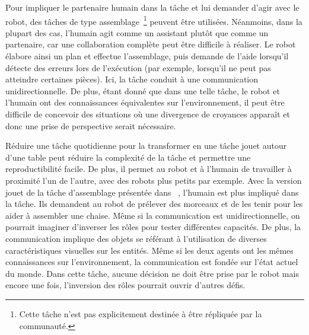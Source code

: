 Pour impliquer le partenaire humain dans la tâche et lui demander d'agir avec le robot, des tâches de type assemblage~\cite{tellex_2014_asking}\footnote{Cette tâche n'est pas explicitement destinée à être répliquée par la communauté.} peuvent être utilisées. Néanmoins, dans la plupart des cas, l'humain agit comme un assistant plutôt que comme un partenaire, car une collaboration complète peut être difficile à réaliser. Le robot élabore ainsi un plan et effectue l'assemblage, puis demande de l'aide lorsqu'il détecte des erreurs lors de l'exécution (par exemple, lorsqu'il ne peut pas atteindre certaines pièces). Ici, la tâche conduit à une communication unidirectionnelle. De plus, étant donné que dans une telle tâche, le robot et l'humain ont des connaissances équivalentes sur l'environnement, il peut être difficile de concevoir des situations où une divergence de croyances apparaît et donc une prise de perspective serait nécessaire.

Réduire une tâche quotidienne pour la transformer en une tâche jouet autour d'une table peut réduire la complexité de la tâche et permettre une reproductibilité facile. De plus, il permet au robot et à l'humain de travailler à proximité l'un de l'autre, avec des robots plus petits par exemple. Avec la version jouet de la tâche d'assemblage présentée dans ~\cite{brawer_2018_situated}, l'humain est plus impliqué dans la tâche. Ils demandent au robot de prélever des morceaux et de les tenir pour les aider à assembler une chaise. Même si la communication est unidirectionnelle, on pourrait imaginer d'inverser les rôles pour tester différentes capacités. De plus, la communication implique des objets se référant à l'utilisation de diverses caractéristiques visuelles sur les entités. Même si les deux agents ont les mêmes connaissances sur l'environnement, la communication est fondée sur l'état actuel du monde. Dans cette tâche, aucune décision ne doit être prise par le robot mais encore une fois, l'inversion des rôles pourrait ouvrir d'autres défis.

